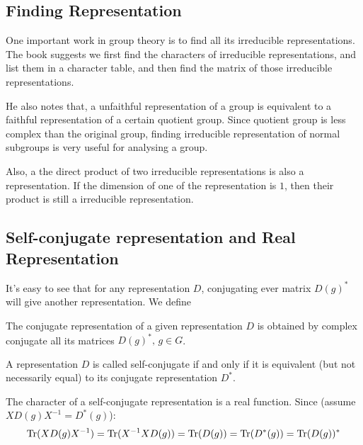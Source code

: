 \subsection{Finding Representation}
\label{sec:Finding-Representation}
One important work in group theory is to find all its irreducible
representations. The book \cite{book} suggests we first find the
characters of irreducible representations, and list them in a
character table, and then find the matrix of those irreducible
representations.

He also notes that, a unfaithful representation of a group is
equivalent to a faithful representation of a certain quotient group.
Since quotient group is less complex than the original group, finding
irreducible representation of normal subgroups is very useful for
analysing a group.

\begin{fact}
    Also, a the direct product of two irreducible representations is also
    a representation. If the dimension of one of the representation is
    $1$, then their product is still a irreducible representation.
\end{fact}
\subsection{Self-conjugate representation and Real Representation}
\label{sec:Self-conjugate-representation-and-Real-Representation}

It's easy to see that for any representation $D$, conjugating ever
matrix $D(g)^*$ will give another representation. We define
\begin{defi}
    The conjugate representation of a given representation $D$ is obtained
    by complex conjugate all its matrices $D(g)^*,\,g\in G$.
\end{defi}
\begin{defi}
    A representation $D$ is called self-conjugate if and only if it is
    equivalent (but not necessarily equal) to its conjugate
    representation $D^*$.
\end{defi}
\begin{fact}
    The character of a self-conjugate representation is a real
    function. Since (assume $XD(g)X^{-1}=D^*(g)$):
    $$
        \operatorname{Tr}(XD(g)X^{-1}) = \operatorname{Tr}(X^{-1}XD(g)) = \operatorname{Tr}(D(g)) = \operatorname{Tr}(D^*(g))
        = \operatorname{Tr}(D(g))^*
    $$
\end{fact}

